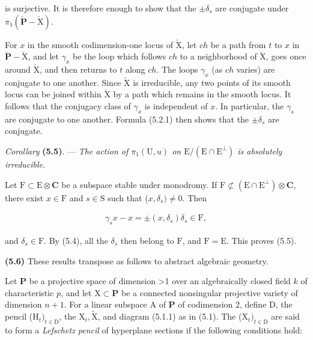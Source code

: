 \documentclass[10pt,leqno]{article}
\begin{document}
\noindent is surjective. It is therefore enough to show that the \(\pm \delta _{s}\) are conjugate under \(\pi _{1}(\check{\mathbf{P}}- \check{\mathrm{X}})\).\par

\noindent For \(x\) in the smooth codimension-one locus of \(\check{\mathrm{X}}\), let \(ch\) be a path from \(t\) to \(x\) in \(\check{\mathbf{P}}- \check{\mathrm{X}}\), and let \(\gamma _{x}\) be the loop which follows \(ch\) to a neighborhood of \(\check{\mathrm{X}}\), goes once around \(\check{\mathrm{X}}\), and then returns to \(t\) along \(ch\). The loops \(\gamma _{x}\) (as \(ch\) varies) are conjugate to one another. Since \(\check{\mathrm{X}}\) is irreducible, any two points of its smooth locus can be joined within \(\check{\mathrm{X}}\) by a path which remains in the smooth locus. It follows that the conjugacy class of \(\gamma _{x}\) is independent of \(x\). In particular, the \(\gamma _{s}\) are conjugate to one another. Formula (5.2.1) then shows that the \(\pm \delta _{s}\) are conjugate.\par

\noindent \emph{Corollary} \textbf{(5.5)}. — {\itshape The action of \(\pi _{1}(\mathrm{U},u)\) on \(\mathrm{E}/(\mathrm{E}\cap \mathrm{E}^{\perp })\) is absolutely irreducible.}\par

\noindent Let \(\mathrm{F}\subset \mathrm{E}\otimes \mathbf{C}\) be a subspace stable under monodromy. If \(\mathrm{F}\not\subset (\mathrm{E}\cap \mathrm{E}^{\perp })\otimes \mathbf{C}\), there exist \(x\in \mathrm{F}\) and \(s\in \mathrm{S}\) such that (\(x,\delta _{s})\ne 0\). Then\par

\begin{equation*}\begin{gathered}\gamma _{s} x- x = \pm (x,\delta _{s})\delta _{s} \in  \mathrm{F},\end{gathered}\end{equation*}

\noindent and \(\delta _{s}\in \mathrm{F}\). By (5.4), all the \(\delta _{s}\) then belong to \(\mathrm{F}\), and \(\mathrm{F}=\mathrm{E}\). This proves (5.5).\par

\noindent \textbf{(5.6)} These results transpose as follows to abstract algebraic geometry.\par

\noindent Let \(\mathbf{P}\) be a projective space of dimension >1 over an algebraically closed field \(k\) of characteristic \(p\), and let \(\mathrm{X}\subset \mathbf{P}\) be a connected nonsingular projective variety of dimension \(n+1\). For a linear subspace \(\mathrm{A}\) of \(\mathbf{P}\) of codimension 2, define \(\mathrm{D}\), the pencil (\(\mathrm{H}_{t})_{t\in \mathrm{D}}\), the \(\mathrm{X}_{t}, \widetilde{\mathrm{X}}\), and diagram (5.1.1) as in (5.1). The (\(\mathrm{X}_{t})_{t\in \mathrm{D}}\) are said to form a \emph{Lefschetz pencil} of hyperplane sections if the following conditions hold:\par
\end{document}
